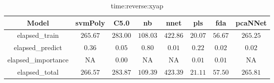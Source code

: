 \begin{table}[!ht]
	\centering
	\begin{tabular}{|c|c|c|c|c|c|c|c|}
		\hline
		Model & svmPoly & C5.0 & nb & nnet & pls & fda & pcaNNet \\ \hline
		elapsed_train & $265.67$ & $283.00$ & $108.03$ & $422.86$ & $20.07$ & $56.67$ & $265.25$ \\ \hline
		elapsed_predict & $0.36$ & $0.05$ & $0.80$ & $0.01$ & $0.22$ & $0.02$ & $0.02$ \\ \hline
		elapsed_importance & NA & $0.00$ & NA & NA & $0.01$ & $0.01$ & NA \\ \hline
		elapsed_total & $266.57$ & $283.87$ & $109.39$ & $423.39$ & $21.11$ & $57.50$ & $265.81$ \\ \hline
	\end{tabular}
	\caption{time:reverse:xyap}
	\label{tab:time:reverse:xyap}
\end{table}
